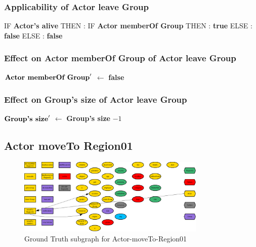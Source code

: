\documentclass{article}%
\begin{document}
%
\subsubsection{Applicability of Actor leave Group}%
\label{ssubsec:Applicability of Actor leave Group}%
\begin{flushleft}%
IF %
\textbf{Actor's alive}%
\linebreak%
\hspace*{2em}%
THEN %
: %
IF %
\textbf{Actor memberOf Group}%
\linebreak%
\hspace*{4em}%
THEN %
: %
\textbf{true}%
\linebreak%
\hspace*{4em}%
ELSE %
: %
\textbf{false}%
\linebreak%
\hspace*{2em}%
ELSE %
: %
\textbf{false}%
\end{flushleft}

%
\subsubsection{Effect on Actor memberOf Group of Actor leave Group}%
\label{ssubsec:Effect on Actor memberOf Group of Actor leave Group}%
\begin{flushleft}%
$\mbox{\textbf{Actor memberOf Group}} '$%
$\leftarrow$%
\textbf{false}%
\end{flushleft}

%
\subsubsection{Effect on Group's size of Actor leave Group}%
\label{ssubsec:Effect on Group's size of Actor leave Group}%
\begin{flushleft}%
$\mbox{\textbf{Group's size}} '$%
$\leftarrow$%
\textbf{Group's size}%
${-}1$%
\end{flushleft}

%
\subsection{Actor moveTo Region01}%
\label{subsec:Actor moveTo Region01}%


\begin{figure}[ht]%
\centering%
\includegraphics[width=0.8\textwidth]{images/Actor-moveTo-Region01.png}%
\caption{Ground Truth subgraph for Actor{-}moveTo{-}Region01}%
\end{figure}
\end{document}
